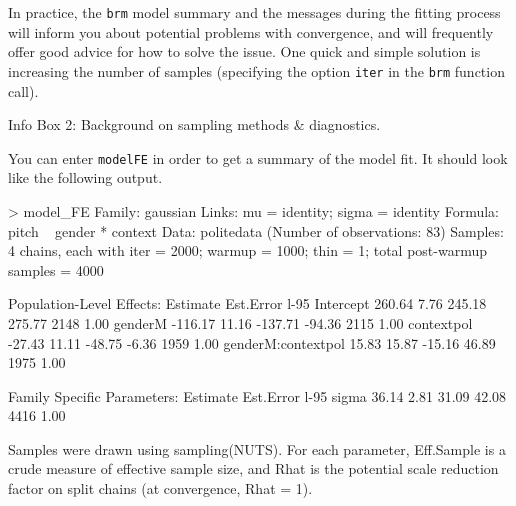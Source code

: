 \documentclass[nobib]{tufte-handout}
\begin{document}
\begin{InfoBox}[]
{\begin{minipage}{1\textwidth}
    \medskip
  
    In practice, the \texttt{brm} model summary and the messages during the fitting process will inform you about potential problems with convergence, and will frequently offer good advice for how to solve the issue. One quick and simple solution is increasing the number of samples (specifying the option \texttt{iter} in the \texttt{brm} function call).
   
  \end{minipage} \par
  } \par
  \begin{center}
    Info Box 2: Background on sampling methods \& diagnostics.
  \end{center}
\end{InfoBox}


You can enter \texttt{modelFE} in order to get a summary of the model fit. It should look like the following output.

\bigskip

\begin{minipage}[]{1.2\textwidth}
\begin{rc}
> model_FE
 Family: gaussian 
  Links: mu = identity; sigma = identity 
Formula: pitch ~ gender * context 
   Data: politedata (Number of observations: 83) 
Samples: 4 chains, each with iter = 2000; warmup = 1000; thin = 1;
         total post-warmup samples = 4000

Population-Level Effects: 
                   Estimate Est.Error l-95%
Intercept            260.64      7.76   245.18   275.77       2148 1.00
genderM             -116.17     11.16  -137.71   -94.36       2115 1.00
contextpol           -27.43     11.11   -48.75    -6.36       1959 1.00
genderM:contextpol    15.83     15.87   -15.16    46.89       1975 1.00

Family Specific Parameters: 
      Estimate Est.Error l-95%
sigma    36.14      2.81    31.09    42.08       4416 1.00

Samples were drawn using sampling(NUTS). For each parameter, Eff.Sample 
is a crude measure of effective sample size, and Rhat is the potential 
scale reduction factor on split chains (at convergence, Rhat = 1).
\end{rc}
\end{minipage}
\end{document}
